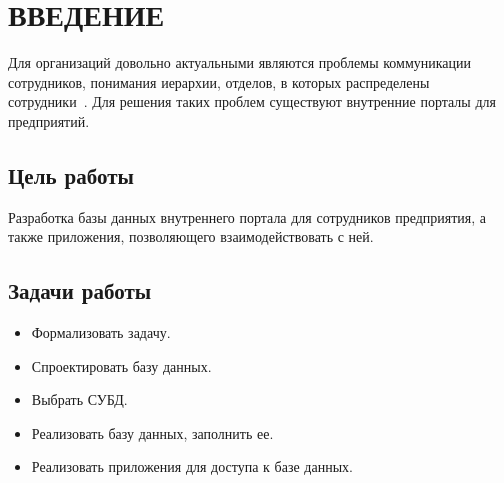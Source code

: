 \chapter*{ВВЕДЕНИЕ}

Для организаций довольно актуальными являются проблемы коммуникации сотрудников, понимания иерархии, отделов, в которых распределены сотрудники~\cite{intranet_vk}. Для решения таких проблем существуют внутренние порталы для предприятий.

\section*{Цель работы}
Разработка базы данных внутреннего портала для сотрудников предприятия, а также приложения, позволяющего взаимодействовать с ней.

\section*{Задачи работы}
\begin{itemize}
	\item Формализовать задачу.
	\item Спроектировать базу данных.
	\item Выбрать СУБД.
	\item Реализовать базу данных, заполнить ее.
	\item Реализовать приложения для доступа к базе данных.
\end{itemize}
